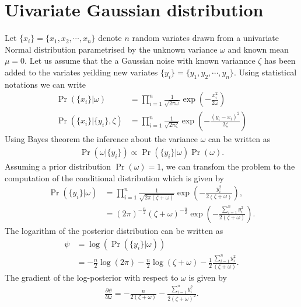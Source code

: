 \documentclass[11pt,twoside,a4paper]{article}
\begin{document}
\section{Uivariate Gaussian distribution}
  Let $\{x_i\}= \{x_1, x_2, \cdots,x_n\}$ denote $n$ random variates drawn from
  a univariate Normal distribution parametrised by the unknown variance $\omega$
  and known mean $\mu = 0$. Let us assume that the a Gaussian noise with known
  variannce $\zeta$ has been added to the variates yeilding new variates
  $\{y_i\}= \{y_1, y_2, \cdots,y_n\}$. Using statistical notations we can write
  \begin{align}
    \label{eqn_posteriors_signal_and_noise}
    \Pr \left(\{x_i\} | \omega \right) &= \prod_{i=1}^n
      \frac{1}{\sqrt{2 \pi \omega}} \exp \left(-\frac{x_i^2}{2 \omega} \right)\\
    \Pr \left(\{x_i\} | \{y_i\}, \zeta \right) &= \prod_{i=1}^n
      \frac{1}{\sqrt{2 \pi \zeta}} \exp
      \left(-\frac{\left(y_i - x_i \right)^2}{2 \zeta} \right)
  \end{align}
  Using Bayes theorem the inference about the variance $\omega$ can be written
  as
  \begin{align}
    \label{eqn_posterior_omega_given_noisy_random_variates}
    \Pr \left(\omega | \{y_i\} \right) \propto
      \Pr \left(\{y_i\} | \omega \right) \Pr(\omega).
  \end{align}
  Assuming a prior distribution $\Pr(\omega) = 1$, we can transfom the problem
  to the computation of the conditional distribution which is given by
  \begin{align}
    \Pr \left(\{y_i\} | \omega \right) &= \prod_{i=1}^n
      \frac{1}{\sqrt{2 \pi (\zeta + \omega)}} \exp
      \left(-\frac{y_i^2}{2(\zeta + \omega)} \right), \nonumber \\
    &= (2 \pi)^{-\frac{n}{2}} \left(\zeta + \omega \right)^{-\frac{n}{2}}
      \exp \left(-\frac{\sum_{i=1}^n y_i^2}{2 (\zeta + \omega)} \right) .
  \end{align}
  The logarithm of the posterior distribution can be written as
  \begin{align}
    \psi &= \log \left(\Pr \left(\{y_i\} | \omega \right) \right) \\
    &= -\frac{n}{2}\log(2 \pi) - \frac{n}{2}\log(\zeta + \omega)
      -\frac{1}{2} \frac{\sum_{i=1}^n y_i^2}{(\zeta + \omega)}.
  \end{align}
  The gradient of the log-posterior with respect to $\omega$ is given by
  \begin{align}
    \frac{\partial \psi}{\partial \omega} = -\frac{n}{2 (\zeta + \omega)}
      -\frac{\sum_{i=1}^n y_i^2}{2 (\zeta + \omega)^2}.
  \end{align}
\end{document}
